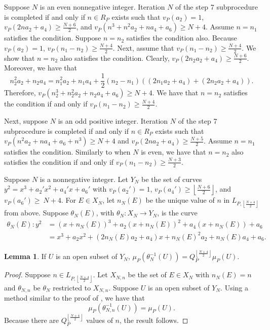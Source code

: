\documentclass[12pt,letterpaper]{amsart}
\theoremstyle{definition}
\newtheorem{lemma}[theorem]{Lemma}
\begin{document}
Suppose $N$ is an even nonnegative integer. Iteration $N$ of the step 7 subprocedure is completed if and only if $n\in R_P$ exists such that $v_P(a_2)=1$, $v_P(2n a_2+a_4)\geq\frac{N+6}{2}$, and $v_P(n^3+n^2a_2+na_4+a_6)\geq N+4$. Assume $n=n_1$ satisfies the condition. Suppose $n=n_2$ satisfies the condition also. Because $v_P(a_2)=1$, $v_P(n_1-n_2)\geq\frac{N+4}{2}$. Next, assume that $v_P(n_1-n_2)\geq\frac{N+4}{2}$. We show that $n=n_2$ also satisfies the condition. Clearly, $v_P(2n_2a_2+a_4)\geq\frac{N+6}{2}$. Moreover, we have that
\[
n_2^2a_2+n_2a_4 = n_1^2a_2+n_1a_4+\frac{1}{2}(n_2-n_1)((2n_1a_2+a_4)+(2n_2a_2+a_4)).
\]
Therefore, $v_P(n_2^3+n_2^2a_2+n_2a_4+a_6)\geq N+4$. We have that $n=n_2$ satisfies the condition if and only if $v_P(n_1-n_2)\geq \frac{N+4}{2}$.

Next, suppose $N$ is an odd positive integer. Iteration $N$ of the step 7 subprocedure is completed if and only if $n\in R_P$ exists such that $v_P(n^2 a_2 + na_4+a_6+n^3)\geq N+4$ and $v_P(2n a_2 + a_4)\geq\frac{N+5}{2}$. Assume $n=n_1$ satisfies the condition. Similarly to when $N$ is even, we have that $n=n_2$ also satisfies the condition if and only if $v_P(n_1-n_2)\geq \frac{N+3}{2}$.

Suppose $N$ is a nonnegative integer. Let $Y_N$ be the set of curves $y^2=x^3+a_2'x^2+a_4'x+a_6'$ with $v_P(a_2')=1$, $v_P(a_4')\geq\left\lfloor\frac{N+6}{2}\right\rfloor$, and $v_P(a_6')\geq\ N+4$. For $E\in X_N$, let $n_N(E)$ be the unique value of $n$ in $L_{P, \left\lfloor\frac{N+4}{2}\right\rfloor}$ from above. Suppose $\theta_N(E)$, with $\theta_N: X_N\rightarrow Y_N$, is the curve
\begin{align*}
\theta_N(E): y^2 & =(x+n_N(E))^3+a_2(x+n_N(E))^2+a_4(x+n_N(E))+a_6 \\
& = x^3 + a_2x^2 + (2n_N(E)a_2+a_4)x + n_N(E)^2 a_2 +n_N(E) a_4 +a_6.
\end{align*}

\begin{lemma}
\label{invdensitysub2}
If $U$ is an open subset of $Y_N$, $\mu_P(\theta_N^{-1}(U))=Q_P^{\left\lfloor\frac{N+4}{2}\right\rfloor}\mu_P(U)$.
\end{lemma}
\begin{proof}
Suppose $n\in L_{P, \left\lfloor\frac{N+4}{2}\right\rfloor}$. Let $X_{N,n}$ be the set of $E\in X_N$ with $n_N(E)=n$ and $\theta_{N,n}$ be $\theta_N$ restricted to $X_{N,n}$. Suppose $U$ is an open subset of $Y_N$. Using a method similar to the proof of , we have that
\[
\mu_P(\theta_{N,n}^{-1}(U)) = \mu_P(U).
\]
Because there are $Q_P^{\left\lfloor\frac{N+4}{2}\right\rfloor}$ values of $n$, the result follows.
\end{proof}
\end{document}
